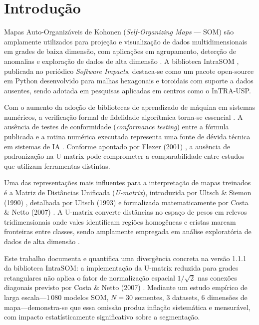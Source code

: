 \documentclass[10pt,journal,compsoc,twocolumn]{IEEEtran}
\begin{document}
\section{Introdu\c{c}\~ao}
\label{sec:intro}
 Mapas Auto-Organiz\'aveis de Kohonen
(\textit{Self-Organizing Maps} --- SOM) \cite{kohonen1982self, kohonen2001self}
s\~ao amplamente utilizados para proje\c{c}\~ao e visualiza\c{c}\~ao de dados
multidimensionais em grades de baixa dimens\~ao, com aplica\c{c}\~oes em
agrupamento, detec\c{c}\~ao de anomalias e explora\c{c}\~ao de dados de alta
dimens\~ao \cite{kohonen2013essentials, vesanto2000clustering}. A biblioteca
IntraSOM \cite{gouvea2023intrasom}, publicada no peri\'odico
\textit{Software Impacts}, destaca-se como um pacote open-source em Python
desenvolvido para malhas hexagonais e toroidais com suporte a dados ausentes,
sendo adotada em pesquisas aplicadas em centros como o InTRA-USP.

Com o aumento da ado\c{c}\~ao de bibliotecas de aprendizado de m\'aquina em
sistemas num\'ericos, a verifica\c{c}\~ao formal de fidelidade algor\'itmica
torna-se essencial \cite{peng2011reproducible, stodden2014implementing}.
A aus\^encia de testes de conformidade (\textit{conformance testing}) entre
a f\'ormula publicada e a rotina num\'erica executada representa uma fonte
de d\'evida t\'ecnica em sistemas de IA \cite{sculley2015hidden, sandve2013ten}.
Conforme apontado por Flexer (2001) \cite{flexer2001use}, a aus\^encia de
padroniza\c{c}\~ao na U-matrix pode comprometer a comparabilidade entre
estudos que utilizam ferramentas distintas.

Uma das representa\c{c}\~oes mais influentes para a interpreta\c{c}\~ao de
mapas treinados \'e a Matriz de Dist\^ancias Unificada (\textit{U-matrix}),
introduzida por Ultsch \& Siemon (1990) \cite{ultsch1990innc}, detalhada por
Ultsch (1993) \cite{ultsch1993self} e formalizada matematicamente por Costa
\& Netto (2007) \cite{costa2007segmentacao}. A U-matrix converte dist\^ancias
no espa\c{c}o de pesos em relevos tridimensionais onde vales identificam
regi\~oes homog\^eneas e cristas marcam fronteiras entre classes, sendo
amplamente empregada em an\'alise explorat\'oria de dados de alta dimens\~ao
\cite{venna2007visualizing, vesanto2000clustering}.

Este trabalho documenta e quantifica uma diverg\^encia concreta na
vers\~ao 1.1.1 da biblioteca IntraSOM: a implementa\c{c}\~ao da U-matrix
reduzida para grades retangulares n\~ao aplica o fator de normaliza\c{c}\~ao
espacial $1/\sqrt{2}$ nas conex\~oes diagonais previsto por Costa \& Netto
(2007) \cite{costa2007segmentacao}. Mediante um estudo emp\'irico de larga
escala---1\,080 modelos SOM, $N=30$ sementes, 3 datasets, 6 dimens\~oes de
mapa---demonstra-se que essa omiss\~ao produz infla\c{c}\~ao sistem\'atica e
mensur\'avel, com impacto estat\'isticamente significativo sobre a segmenta\c{c}\~ao.
\end{document}
